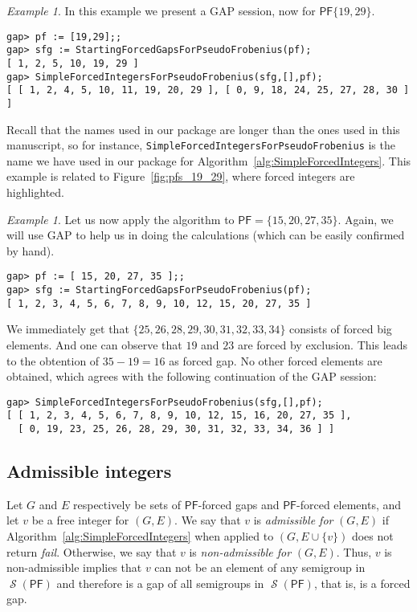 \documentclass[11pt]{amsart}
\theoremstyle{remark}
\newtheorem{example}[theorem]{Example}
\begin{document}
\begin{example}\label{example:forced_picture}
In this example we present a \textsf{GAP} session, now for ${\ensuremath{\mathsf{PF}}}\{19,29\}$.
\begin{verbatim}
gap> pf := [19,29];;                            
gap> sfg := StartingForcedGapsForPseudoFrobenius(pf);
[ 1, 2, 5, 10, 19, 29 ]
gap> SimpleForcedIntegersForPseudoFrobenius(sfg,[],pf);
[ [ 1, 2, 4, 5, 10, 11, 19, 20, 29 ], [ 0, 9, 18, 24, 25, 27, 28, 30 ] ]
\end{verbatim}
Recall that the names used in our package are longer than the ones used in this manuscript, so for instance, \texttt{SimpleForcedIntegersForPseudoFrobenius} is the name we have used in our package for Algorithm~\ref{alg:SimpleForcedIntegers}. 
This example is related to Figure~\ref{fig:pfs_19_29}, where forced integers are highlighted.
\end{example}
\begin{example}\label{ex:forced_ints_for_tree}
Let us now apply the algorithm to ${\ensuremath{\mathsf{PF}}}=\{15, 20, 27, 35\}$. Again, we will use \textsf{GAP} to help us in doing the calculations (which can be easily confirmed by hand).
\begin{verbatim}
gap> pf := [ 15, 20, 27, 35 ];;
gap> sfg := StartingForcedGapsForPseudoFrobenius(pf);                    
[ 1, 2, 3, 4, 5, 6, 7, 8, 9, 10, 12, 15, 20, 27, 35 ]
\end{verbatim}
We immediately get that $\{ 25, 26, 28, 29, 30, 31, 32, 33, 34\}$ consists of forced big elements. And one can observe that $19$ and $23$ are forced by exclusion. This leads to the obtention of $35-19 =16$ as forced gap.
No other forced elements are obtained, which agrees with the following continuation of the \textsf{GAP} session:
\begin{verbatim}
gap> SimpleForcedIntegersForPseudoFrobenius(sfg,[],pf);
[ [ 1, 2, 3, 4, 5, 6, 7, 8, 9, 10, 12, 15, 16, 20, 27, 35 ], 
  [ 0, 19, 23, 25, 26, 28, 29, 30, 31, 32, 33, 34, 36 ] ]
\end{verbatim}
\end{example}

\subsection{Admissible integers}
\label{subsec:admissible_integers}
Let $G$ and $E$ respectively be sets of {\ensuremath{\mathsf{PF}}}-forced gaps and {\ensuremath{\mathsf{PF}}}-forced elements, and let $v$ be a free integer for $(G,E)$. We say that $v$ is \emph{admissible for} $(G,E)$ if Algorithm~\ref{alg:SimpleForcedIntegers} when applied to $(G,E\cup\{v\})$ does not return \emph{fail}. Otherwise, we say that $v$ is \emph{non-admissible for} $(G,E)$. Thus, $v$ is non-admissible implies that $v$ can not be an element of any semigroup in $\operatorname{\mathcal{S}}({\ensuremath{\mathsf{PF}}})$ and therefore is a gap of all semigroups in $\operatorname{\mathcal{S}}({\ensuremath{\mathsf{PF}}})$, that is, is a forced gap.
\end{document}
